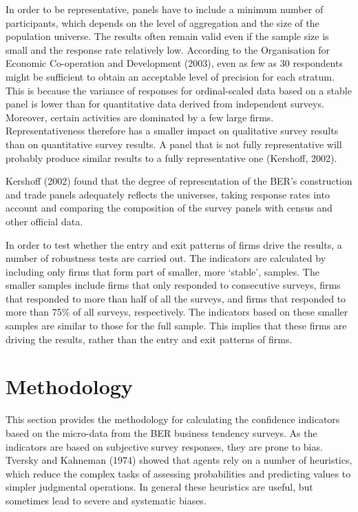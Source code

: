 \documentclass[11pt,]{article}
\begin{document}
In order to be representative, panels have to include a minimum number
of participants, which depends on the level of aggregation and the size
of the population universe. The results often remain valid even if the
sample size is small and the response rate relatively low. According to
the Organisation for Economic Co-operation and Development (2003), even
as few as 30 respondents might be sufficient to obtain an acceptable
level of precision for each stratum. This is because the variance of
responses for ordinal-scaled data based on a stable panel is lower than
for quantitative data derived from independent surveys. Moreover,
certain activities are dominated by a few large firms.
Representativeness therefore has a smaller impact on qualitative survey
results than on quantitative survey results. A panel that is not fully
representative will probably produce similar results to a fully
representative one (Kershoff, 2002).

Kershoff (2002) found that the degree of representation of the BER's
construction and trade panels adequately reflects the universes, taking
response rates into account and comparing the composition of the survey
panels with census and other official data.

In order to test whether the entry and exit patterns of firms drive the
results, a number of robustness tests are carried out. The indicators
are calculated by including only firms that form part of smaller, more
`stable', samples. The smaller samples include firms that only responded
to consecutive surveys, firms that responded to more than half of all
the surveys, and firms that responded to more than 75\% of all surveys,
respectively. The indicators based on these smaller samples are similar
to those for the full sample. This implies that these firms are driving
the results, rather than the entry and exit patterns of firms.

\section{Methodology}\label{methodology}

This section provides the methodology for calculating the confidence
indicators based on the micro-data from the BER business tendency
surveys. As the indicators are based on subjective survey responses,
they are prone to bias. Tversky and Kahneman (1974) showed that agents
rely on a number of heuristics, which reduce the complex tasks of
assessing probabilities and predicting values to simpler judgmental
operations. In general these heuristics are useful, but sometimes lead
to severe and systematic biases.
\end{document}
